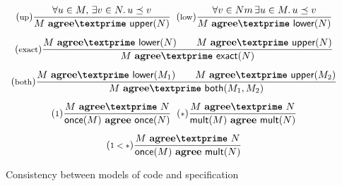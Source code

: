 \documentclass[10pt,preprint]{sigplanconf}
\theoremstyle{definition}
\newcommand{\trule}[1]{{\footnotesize{(\text{#1})}}}
\newcommand{\consName}{\textbf{agree\textprime}}
\newcommand{\cons}[2]{#1 \,\, \consName{} \,\, #2}
\newcommand{\consAName}{\textbf{agree}}
\newcommand{\consA}[2]{#1 \,\, \consAName{} \,\, #2}
\begin{document}
\begin{figure}[t]
\begin{align*}
\begin{array}{c}
\trule{up}\dfrac{\forall u \in M, \, \exists v \in N .  \, u \preceq v}
      {\cons{M}{\textsf{upper}(N)}}
\;\;
\trule{low}\dfrac{\forall v \in Nm \, \exists u \in M . \, u \preceq v}
      {\cons{M}{\textsf{lower}(N)}} \\[1.5em]
\trule{exact}\dfrac{\cons{M}{\textsf{lower}(N)} \qquad \cons{M}{\textsf{upper}(N)}}
  {\cons{M}{\textsf{exact}(N)}} \\[1.5em]
\trule{both}\dfrac{\cons{M}{\textsf{lower}(M_1)} \qquad \cons{M}{\textsf{upper}(M_2)}}
  {\cons{M}{\textsf{both}(M_1, M_2)}}\\[1.5em]
\trule{$1$}
\dfrac{\cons{M}{N}}{\consA{\textsf{once}(M)}{\textsf{once}(N)}}
\;\;
\trule{$*$}
\dfrac{\cons{M}{N}}{\consA{\textsf{mult}(M)}{\textsf{mult}(N)}}
  \\[1.5em]
\trule{$1 < *$}
\dfrac{\cons{M}{N}}{\consA{\textsf{once}(M)}{\textsf{mult}(N)}}
\end{array}
\end{align*}
\caption{Consistency between models of code and specification}
\label{fig:consistency}
\vspace{-0.9em}
\end{figure}
\end{document}
